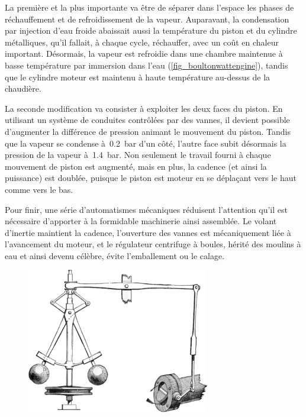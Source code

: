 	La première et la plus importante va être de séparer dans l’espace les phases de réchauffement et de refroidissement de la vapeur. Auparavant, la condensation par injection d’eau froide abaissait aussi la température du piston et du cylindre métalliques, qu’il fallait, à chaque cycle, réchauffer, avec un coût en chaleur important. Désormais, la vapeur est refroidie dans une chambre maintenue à basse température par immersion dans l’eau (\cref{fig_boultonwattengine}), tandis que le cylindre moteur est maintenu à haute température au-dessus de la chaudière.

	La seconde modification va consister à exploiter les deux faces du piston. En utilisant un système de conduites contrôlées par des vannes, il devient possible d’augmenter la différence de pression animant le mouvement du piston. Tandis que la vapeur se condense à~\SI{0,2}{\bar} d’un côté, l’autre face subit désormais la pression de la vapeur à~\SI{1,4}{\bar}. Non seulement le travail fourni à chaque mouvement de piston est augmenté, mais en plus, la cadence (et ainsi la puissance) est doublée, puisque le piston est moteur en se déplaçant vers le haut comme vers le bas.

	Pour finir, une série d’automatismes mécaniques réduisent l’attention qu’il est nécessaire d’apporter à la formidable machinerie ainsi assemblée. Le volant d’inertie maintient la cadence, l’ouverture des vannes est mécaniquement liée à l’avancement du moteur, et le régulateur centrifuge à boules, hérité des moulins à eau et ainsi devenu célèbre, évite l’emballement ou le calage.

	\begin{figure}
	\begin{center}
		\includegraphics[width=8cm]{images/centrifugal_governor.png}
	\end{center}
	\end{figure}


